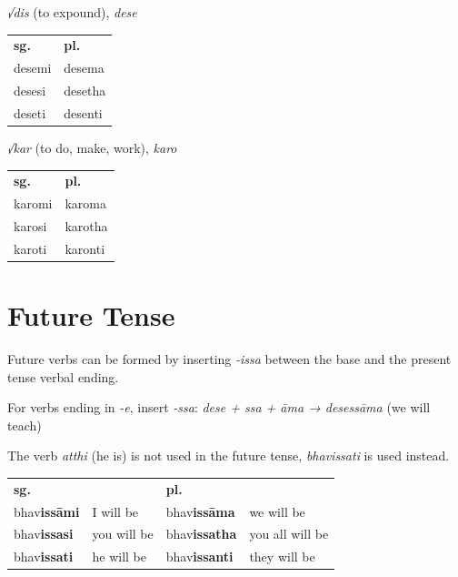 \documentclass[11pt,oneside]{memoir}
\begin{document}
{\begin{multicols}{3}
\columnbreak

\emph{√dis} (to expound), \emph{dese}

\begin{center}
\begin{tabular}{ll}
\textbf{sg.} & \textbf{pl.}\\
desemi & desema\\
desesi & desetha\\
deseti & desenti\\
\end{tabular}
\end{center}

\columnbreak

\emph{√kar} (to do, make, work), \emph{karo}

\begin{center}
\begin{tabular}{ll}
\textbf{sg.} & \textbf{pl.}\\
karomi & karoma\\
karosi & karotha\\
karoti & karonti\\
\end{tabular}
\end{center}

\end{multicols}
\par}
\section{Future Tense}
\label{sec:orgcdfb02c}

Future verbs can be formed by inserting \emph{-issa} between the base and the
present tense verbal ending.

For verbs ending in \emph{-e}, insert \emph{-ssa}: \emph{dese + ssa + āma → desessāma} (we will teach)

The verb \emph{atthi} (he is) is not used in the future tense, \emph{bhavissati} is used instead.

\begin{center}
\begin{tabular}{llll}
\textbf{sg.} &  & \textbf{pl.} & \\
bhav\textbf{issāmi} & I will be & bhav\textbf{issāma} & we will be\\
bhav\textbf{issasi} & you will be & bhav\textbf{issatha} & you all will be\\
bhav\textbf{issati} & he will be & bhav\textbf{issanti} & they will be\\
\end{tabular}
\end{center}
\end{document}

